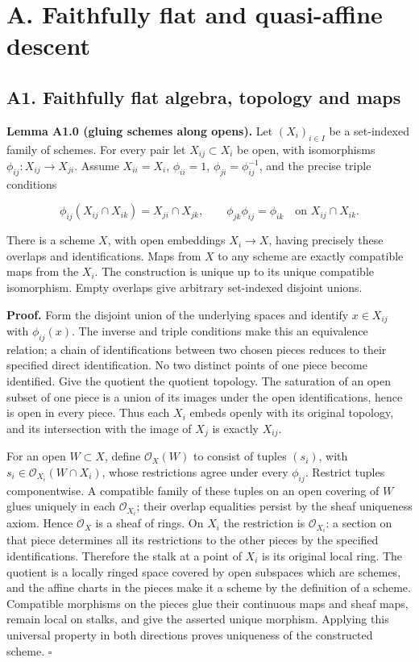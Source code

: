 \documentclass[11pt,a4paper,openany]{report}
\begin{document}
\section{A. Faithfully flat and quasi-affine descent}\label{AG-RG-S04-a.-faithfully-flat-and-quasi-affine-descent}

\subsection{A1. Faithfully flat algebra, topology and maps}\label{AG-RG-S04-a1.-faithfully-flat-algebra-topology-and-maps}

\label{AG-RG-S04-scheme-open-gluing} \textbf{Lemma A1.0 (gluing schemes along opens).} Let \((X_i)_{i\in I}\) be a set-indexed family of schemes. For every pair let \(X_{ij}\subset X_i\) be open, with isomorphisms \(\phi_{ij}:X_{ij}\to X_{ji}\). Assume \(X_{ii}=X_i\), \(\phi_{ii}=1\), \(\phi_{ji}=\phi_{ij}^{-1}\), and the precise triple conditions

\[
\phi_{ij}(X_{ij}\cap X_{ik})=X_{ji}\cap X_{jk},\qquad
\phi_{jk}\phi_{ij}=\phi_{ik}\quad\text{on }X_{ij}\cap X_{ik}.
\]

There is a scheme \(X\), with open embeddings \(X_i\to X\), having precisely these overlaps and identifications. Maps from \(X\) to any scheme are exactly compatible maps from the \(X_i\). The construction is unique up to its unique compatible isomorphism. Empty overlaps give arbitrary set-indexed disjoint unions.

\textbf{Proof.} Form the disjoint union of the underlying spaces and identify \(x\in X_{ij}\) with \(\phi_{ij}(x)\). The inverse and triple conditions make this an equivalence relation; a chain of identifications between two chosen pieces reduces to their specified direct identification. No two distinct points of one piece become identified. Give the quotient the quotient topology. The saturation of an open subset of one piece is a union of its images under the open identifications, hence is open in every piece. Thus each \(X_i\) embeds openly with its original topology, and its intersection with the image of \(X_j\) is exactly \(X_{ij}\).

For an open \(W\subset X\), define \(\mathcal O_X(W)\) to consist of tuples \((s_i)\), with \(s_i\in\mathcal O_{X_i}(W\cap X_i)\), whose restrictions agree under every \(\phi_{ij}\). Restrict tuples componentwise. A compatible family of these tuples on an open covering of \(W\) glues uniquely in each \(\mathcal O_{X_i}\); their overlap equalities persist by the sheaf uniqueness axiom. Hence \(\mathcal O_X\) is a sheaf of rings. On \(X_i\) the restriction is \(\mathcal O_{X_i}\): a section on that piece determines all its restrictions to the other pieces by the specified identifications. Therefore the stalk at a point of \(X_i\) is its original local ring. The quotient is a locally ringed space covered by open subspaces which are schemes, and the affine charts in the pieces make it a scheme by the definition of a scheme. Compatible morphisms on the pieces glue their continuous maps and sheaf maps, remain local on stalks, and give the asserted unique morphism. Applying this universal property in both directions proves uniqueness of the constructed scheme. \(\square\)
\end{document}
